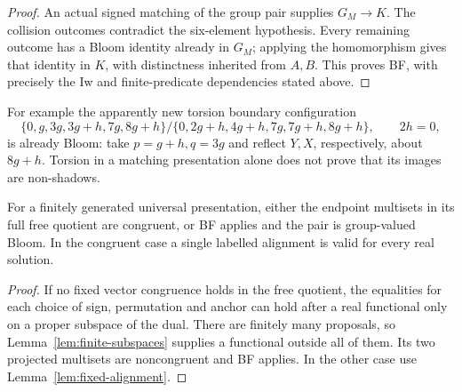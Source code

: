 \begin{proof}
An actual signed matching of the group pair supplies $G_M\to K$.
The collision outcomes contradict the six-element hypothesis. Every
remaining outcome has a Bloom identity already in $G_M$; applying the
homomorphism gives that identity in $K$, with distinctness inherited from
$A,B$. This proves BF, with precisely the Iw and finite-predicate
dependencies stated above.
\end{proof}

For example the apparently new torsion boundary configuration
\[
 \{0,g,3g,3g+h,7g,8g+h\}/
 \{0,2g+h,4g+h,7g,7g+h,8g+h\},\qquad 2h=0,
\]
is already Bloom: take $p=g+h,q=3g$ and reflect $Y,X$, respectively,
about $8g+h$. Torsion in a matching presentation alone does not prove
that its images are non-shadows.

\begin{corollary}\label{cor:free-dichotomy}
For a finitely generated universal presentation, either the endpoint
multisets in its full free quotient are congruent, or BF applies and the
pair is group-valued Bloom. In the congruent case a single labelled
alignment is valid for every real solution.
\end{corollary}
\begin{proof}
If no fixed vector congruence holds in the free quotient, the equalities for each choice of
sign, permutation and anchor can hold after a real functional only
on a proper subspace of the dual. There are finitely many proposals, so
Lemma~\ref{lem:finite-subspaces} supplies a functional outside all of
them. Its two projected multisets are noncongruent and BF applies.
In the other case use Lemma~\ref{lem:fixed-alignment}.
\end{proof}

